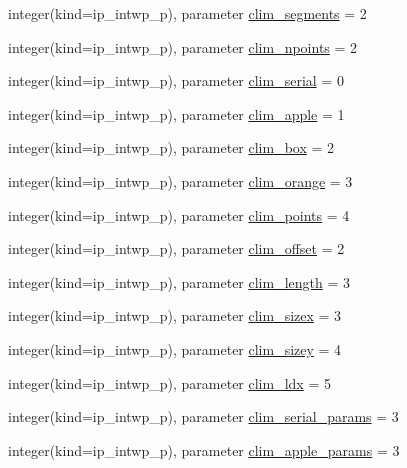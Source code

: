 \begin{DoxyCompactItemize}
\item 
integer(kind=ip\+\_\+intwp\+\_\+p), parameter \hyperlink{namespacemod__oasis__parameters_a7427036a6530871a0f49c0fb75f2b3ef}{clim\+\_\+segments} = 2
\item 
integer(kind=ip\+\_\+intwp\+\_\+p), parameter \hyperlink{namespacemod__oasis__parameters_a6c376f3049b7af988e71a2e50a1c50ba}{clim\+\_\+npoints} = 2
\item 
integer(kind=ip\+\_\+intwp\+\_\+p), parameter \hyperlink{namespacemod__oasis__parameters_a5c410369e763f9156d0ce1c82e866265}{clim\+\_\+serial} = 0
\item 
integer(kind=ip\+\_\+intwp\+\_\+p), parameter \hyperlink{namespacemod__oasis__parameters_a3cfd98fdd1c2fac653b182454c87f4aa}{clim\+\_\+apple} = 1
\item 
integer(kind=ip\+\_\+intwp\+\_\+p), parameter \hyperlink{namespacemod__oasis__parameters_a9a8b38629274e3a38a37f329ce9d2aa2}{clim\+\_\+box} = 2
\item 
integer(kind=ip\+\_\+intwp\+\_\+p), parameter \hyperlink{namespacemod__oasis__parameters_a17c74cc8141b595e448588b1add0f6bf}{clim\+\_\+orange} = 3
\item 
integer(kind=ip\+\_\+intwp\+\_\+p), parameter \hyperlink{namespacemod__oasis__parameters_aa9d90a3d7d5b21d2081a578dfea42fd4}{clim\+\_\+points} = 4
\item 
integer(kind=ip\+\_\+intwp\+\_\+p), parameter \hyperlink{namespacemod__oasis__parameters_a4cd07733eaf5d8c8148986c0c4217772}{clim\+\_\+offset} = 2
\item 
integer(kind=ip\+\_\+intwp\+\_\+p), parameter \hyperlink{namespacemod__oasis__parameters_a984896e821cbbb8c4a91e86ff19d54de}{clim\+\_\+length} = 3
\item 
integer(kind=ip\+\_\+intwp\+\_\+p), parameter \hyperlink{namespacemod__oasis__parameters_a4fb35a666ab4cec927a2ae9244535cb0}{clim\+\_\+sizex} = 3
\item 
integer(kind=ip\+\_\+intwp\+\_\+p), parameter \hyperlink{namespacemod__oasis__parameters_a206910560c246db3404224a04cfd4319}{clim\+\_\+sizey} = 4
\item 
integer(kind=ip\+\_\+intwp\+\_\+p), parameter \hyperlink{namespacemod__oasis__parameters_a3407c11054d24782182c649307808e47}{clim\+\_\+ldx} = 5
\item 
integer(kind=ip\+\_\+intwp\+\_\+p), parameter \hyperlink{namespacemod__oasis__parameters_a03d86f9ce8a47debbd60515fa94e5b11}{clim\+\_\+serial\+\_\+params} = 3
\item 
integer(kind=ip\+\_\+intwp\+\_\+p), parameter \hyperlink{namespacemod__oasis__parameters_a9c8bcc73b1daadd3dd4814b2dfe5e649}{clim\+\_\+apple\+\_\+params} = 3

\end{DoxyCompactItemize}
